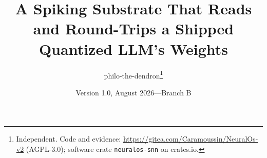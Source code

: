 \documentclass[11pt]{article}
\title{A Spiking Substrate That Reads and Round-Trips a Shipped
  Quantized LLM's Weights}
\author{%
  philo-the-dendron\thanks{Independent. Code and evidence:
  \url{https://gitea.com/Caramoussin/NeuralOs-v2} (AGPL-3.0);
  software crate \texttt{neuralos-snn} on crates.io.}%
}
\date{Version 1.0, August 2026\quad---\quad Branch B}
\begin{document}
\maketitle

\begin{abstract}

\end{abstract}












\appendix





\end{document}
